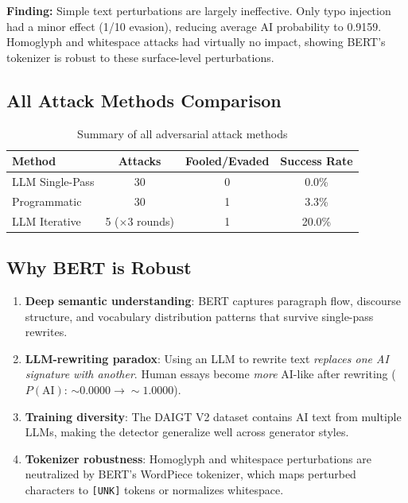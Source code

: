 \documentclass[11pt,a4paper]{article}
\begin{document}
\textbf{Finding:} Simple text perturbations are largely ineffective. Only typo injection had a minor effect (1/10 evasion), reducing average AI probability to 0.9159. Homoglyph and whitespace attacks had virtually no impact, showing BERT's tokenizer is robust to these surface-level perturbations.

\subsection{All Attack Methods Comparison}

\begin{table}[H]
\centering
\caption{Summary of all adversarial attack methods}
\label{tab:attack_summary}
\begin{tabular}{lccc}
\toprule
\textbf{Method} & \textbf{Attacks} & \textbf{Fooled/Evaded} & \textbf{Success Rate} \\
\midrule
LLM Single-Pass     & 30 & 0 & 0.0\% \\
Programmatic         & 30 & 1 & 3.3\% \\
LLM Iterative        & 5 ($\times$3 rounds) & 1 & 20.0\% \\
\bottomrule
\end{tabular}
\end{table}

\subsection{Why BERT is Robust}

\begin{enumerate}
\item \textbf{Deep semantic understanding}: BERT captures paragraph flow, discourse structure, and vocabulary distribution patterns that survive single-pass rewrites.
\item \textbf{LLM-rewriting paradox}: Using an LLM to rewrite text \emph{replaces one AI signature with another}. Human essays become \emph{more} AI-like after rewriting ($P(\text{AI})$: $\sim\!0.0000 \to \sim\!1.0000$).
\item \textbf{Training diversity}: The DAIGT V2 dataset contains AI text from multiple LLMs, making the detector generalize well across generator styles.
\item \textbf{Tokenizer robustness}: Homoglyph and whitespace perturbations are neutralized by BERT's WordPiece tokenizer, which maps perturbed characters to \texttt{[UNK]} tokens or normalizes whitespace.
\end{enumerate}
\end{document}
